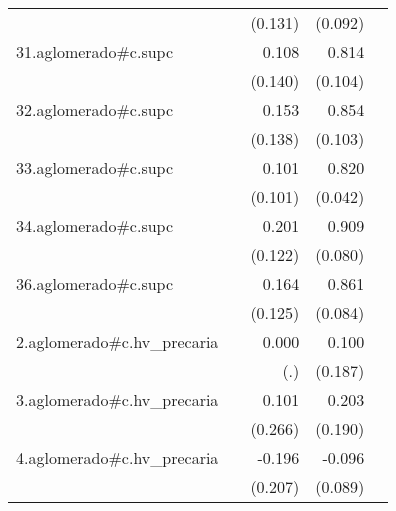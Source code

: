 {\begin{longtable}{l*{4}{D{.}{.}{-1}}}
            &                     &     (0.131)         &     (0.092)         &                     \\
\addlinespace
31.aglomerado#c.supc&                     &       0.108         &       0.814\sym{***}&                     \\
            &                     &     (0.140)         &     (0.104)         &                     \\
\addlinespace
32.aglomerado#c.supc&                     &       0.153         &       0.854\sym{***}&                     \\
            &                     &     (0.138)         &     (0.103)         &                     \\
\addlinespace
33.aglomerado#c.supc&                     &       0.101         &       0.820\sym{***}&                     \\
            &                     &     (0.101)         &     (0.042)         &                     \\
\addlinespace
34.aglomerado#c.supc&                     &       0.201         &       0.909\sym{***}&                     \\
            &                     &     (0.122)         &     (0.080)         &                     \\
\addlinespace
36.aglomerado#c.supc&                     &       0.164         &       0.861\sym{***}&                     \\
            &                     &     (0.125)         &     (0.084)         &                     \\
\addlinespace
2.aglomerado#c.hv\_precaria&                     &       0.000         &       0.100         &                     \\
            &                     &         (.)         &     (0.187)         &                     \\
\addlinespace
3.aglomerado#c.hv\_precaria&                     &       0.101         &       0.203         &                     \\
            &                     &     (0.266)         &     (0.190)         &                     \\
\addlinespace
4.aglomerado#c.hv\_precaria&                     &      -0.196         &      -0.096         &                     \\
            &                     &     (0.207)         &     (0.089)         &                     \\

\end{longtable}}
